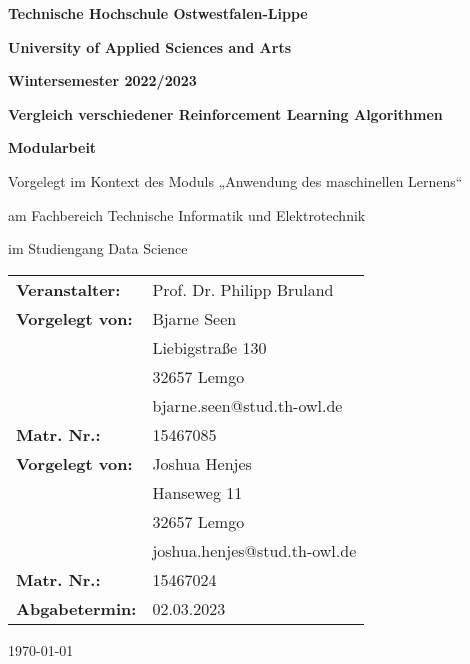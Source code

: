 \documentclass[../documentation.tex]{subfiles}
\begin{document}
\begin{titlepage}
    \begin{center}   
    {\textbf{Technische Hochschule Ostwestfalen-Lippe}}\\
    {\textbf{University of Applied Sciences and Arts}\par}\vspace{1.5cm}
    {\Large\bfseries Wintersemester 2022/2023\par}\vspace{1.5cm}
    {\huge\bfseries Vergleich verschiedener Reinforcement Learning Algorithmen \par}
    \vspace{1.5cm}
    {\Large\bfseries Modularbeit}\\
    {\large Vorgelegt im Kontext des Moduls „Anwendung des maschinellen Lernens“\par} \vspace{1cm}
    {\large am Fachbereich Technische Informatik und Elektrotechnik}\\
    {\large im Studiengang Data Science\par} \vspace{2cm}
    \end{center}
    \vfill
    \begin{tabular}{l l}
    \textbf{Veranstalter:}& {Prof. Dr. Philipp Bruland}\\ 
    \textbf{Vorgelegt von:}& {Bjarne Seen}\\ 
    \textbf{} & {Liebigstraße 130} \\
    \textbf{} & {32657 Lemgo} \\
    \textbf{} & {bjarne.seen@stud.th-owl.de} \\
    \textbf{Matr. Nr.:} & {15467085} \\
    \textbf{Vorgelegt von:}& {Joshua Henjes}\\ 
    \textbf{} & {Hanseweg 11} \\
    \textbf{} & {32657 Lemgo} \\
    \textbf{} & {joshua.henjes@stud.th-owl.de} \\
    \textbf{Matr. Nr.:} & {15467024} \\
    \textbf{Abgabetermin:} & {02.03.2023} 
    \end{tabular}   
    \begin{center}
    \vfill

    {\large\today\par}
    \end{center}
\end{titlepage}
\end{document}
